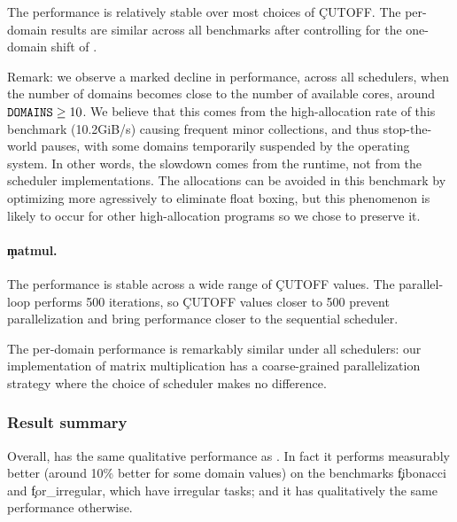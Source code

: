 The performance is relatively stable over most choices of \c{CUTOFF}.
The per-domain results are similar across all benchmarks after controlling for the one-domain shift of \Moonpool.

Remark: we observe a marked decline in performance, across all schedulers, when the number of domains becomes close to the number of available cores, around $\texttt{DOMAINS} \geq 10$. We believe that this comes from the high-allocation rate of this benchmark (10.2GiB/s) causing frequent minor collections, and thus stop-the-world pauses, with some domains temporarily suspended by the operating system. In other words, the slowdown comes from the \OCaml runtime, not from the scheduler implementations. The allocations can be avoided in this benchmark by optimizing more agressively to eliminate float boxing, but this phenomenon is likely to occur for other high-allocation \OCaml programs so we chose to preserve it.

\paragraph{\c{matmul}.}

The performance is stable across a wide range of \c{CUTOFF} values.
The parallel-loop performs 500 iterations, so \c{CUTOFF} values closer to 500 prevent parallelization and bring performance closer to the sequential scheduler.

The per-domain performance is remarkably similar under all schedulers: our implementation of matrix multiplication has a coarse-grained parallelization strategy where the choice of scheduler makes no difference.

\subsubsection{Result summary}

Overall, \Parabs has the same qualitative performance as \Domainslib.
In fact it performs measurably better (around 10\% better for some domain values) on the benchmarks \c{fibonacci} and \c{for\_irregular}, which have irregular tasks; and it has qualitatively the same performance otherwise.
